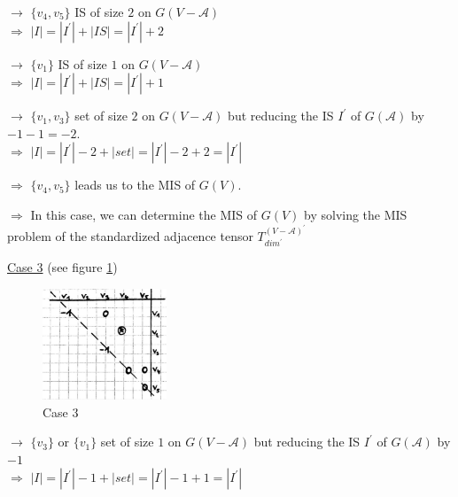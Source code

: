 \documentclass{article}
\newtheorem*{theorem A}{Theorem A}
\newtheorem*{theorem B}{N\"olker's Theorem}
\theoremstyle{remark}
\theoremstyle{remark}
\begin{document}
\begin{enumerate}
    $\rightarrow$ $\{ v_{4}, v_{5} \}$ IS of size $2$ on $G\left(V - \mathcal{A}\right)$\\
        $\Rightarrow$ $|I| = |I^{\prime}| + |IS| = |I^{\prime}| + 2$

    \vspace{0.3cm}
    $\rightarrow$ $\{ v_{1} \}$ IS of size $1$ on $G\left(V - \mathcal{A}\right)$\\
        $\Rightarrow$ $|I| = |I^{\prime}| + |IS| = |I^{\prime}| + 1$

    \vspace{0.3cm}
    $\rightarrow$ $\{ v_{1}, v_{3} \}$ set of size $2$ on $G\left(V - \mathcal{A}\right)$ but reducing the IS $I^{\prime}$ of $G\left(\mathcal{A}\right)$ by $- 1 - 1 = -2$.\\
        $\Rightarrow$ $|I| = |I^{\prime}| - 2 + |set| = |I^{\prime}| - 2 + 2 = |I^{\prime}|$

    \vspace{0.3cm}
    $\Rightarrow$ $\{ v_{4}, v_{5} \}$ leads us to the MIS of $G\left(V\right)$.

    \vspace{0.3cm}
    $\Rightarrow$ In this case, we can determine the MIS of $G\left(V\right)$ by solving the MIS problem of the standardized adjacence tensor $T^{\left(V - \mathcal{A}\right)^{\prime}}_{dim^{\prime}}$



    \vspace{0.3cm}
    \underline{Case 3} (see figure \ref{fig:case3})\\

     \begin{figure}[ht]
	    \centering
        \includegraphics[width=0.33\textwidth]{images/case3.png}
	    \caption{Case 3}
	\label{fig:case3}
    \end{figure}

    $\rightarrow$ $\{ v_{3} \}$ or $\{ v_{1} \}$ set of size $1$ on $G\left(V - \mathcal{A}\right)$ but reducing the IS $I^{\prime}$ of $G\left(\mathcal{A}\right)$ by $-1$\\
        $\Rightarrow$ $|I| = |I^{\prime}| - 1 + |set| = |I^{\prime}| - 1 + 1 = |I^{\prime}|$


\end{enumerate}
\end{document}
